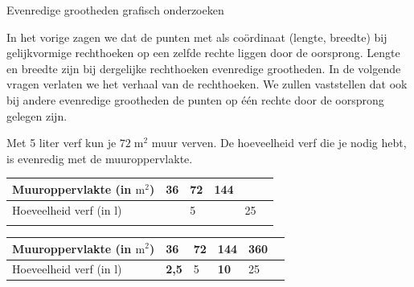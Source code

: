 \begin{lesactiviteit}{Evenredige grootheden grafisch onderzoeken}
\begin{vraagenantwoord}[resume]
    
\end{vraagenantwoord}

In het vorige zagen we dat de punten met als coördinaat (lengte, breedte) bij gelijkvormige rechthoeken op een zelfde rechte liggen door de oorsprong. Lengte en breedte zijn bij dergelijke rechthoeken evenredige grootheden. In de volgende vragen verlaten we het verhaal van de rechthoeken. We zullen vaststellen dat ook bij andere evenredige grootheden de punten op één rechte door de oorsprong gelegen zijn.

Met 5 liter verf kun je $72\;\text{m}^2$ muur verven. De hoeveelheid verf die je nodig hebt, is evenredig met de muuroppervlakte. 

\begin{vraagenantwoord}[resume]

     \begin{tabel}
		\begin{tabular}{m{4cm} C{1cm} C{1cm} C{1cm} C{1cm}C{1cm}}  
			\hlinethick

			Muuroppervlakte (in $\text{m}^2$) & 36 & 72 & 144&  \\
   \hline
   			Hoeveelheid verf (in l)  & & 5 & &25  \\
		
			\hlinethick
		\end{tabular}
	\end{tabel}
\vspace{1cm}

\begin{tabel}
		\begin{tabular}{m{4cm} C{1cm} C{1cm} C{1cm} C{1cm}C{1cm}}  
			\hlinethick

			Muuroppervlakte (in $\text{m}^2$) & 36 & 72 & 144&  \textbf{360}\\
            \hline
   			Hoeveelheid verf (in l)  & \textbf{2,5}& 5 & \textbf{10}&25  \\
		

\end{tabular}
\end{tabel}
\end{vraagenantwoord}
\end{lesactiviteit}
